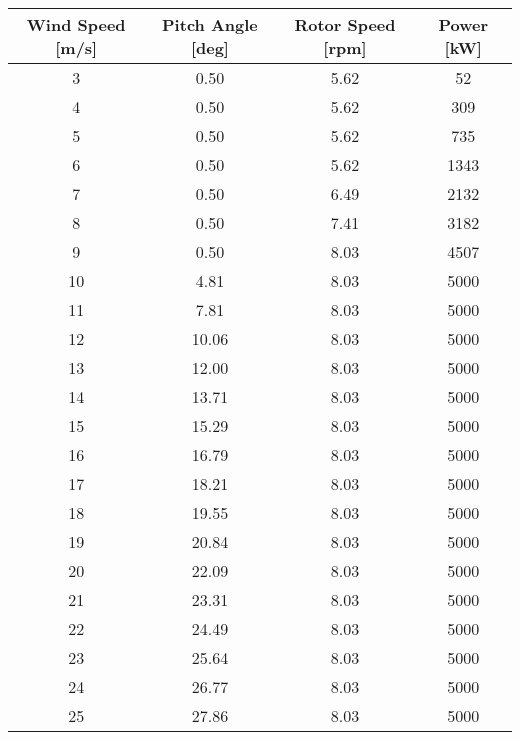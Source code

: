 \begin{table}[!ht]
	\centering
	\begin{tabular}{|c|c|c|c|}
		\hline
		Wind Speed [m/s] & Pitch Angle [deg] & Rotor Speed [rpm] & Power [kW] \\ \hline
		\hline
		3 & 0.50 & 5.62 & 52 \\ \hline
		4 & 0.50 & 5.62 & 309 \\ \hline
		5 & 0.50 & 5.62 & 735 \\ \hline
		6 & 0.50 & 5.62 & 1343 \\ \hline
		7 & 0.50 & 6.49 & 2132 \\ \hline
		8 & 0.50 & 7.41 & 3182 \\ \hline
		9 & 0.50 & 8.03 & 4507 \\ \hline
		10 & 4.81 & 8.03 & 5000 \\ \hline
		11 & 7.81 & 8.03 & 5000 \\ \hline
		12 & 10.06 & 8.03 & 5000 \\ \hline
		13 & 12.00 & 8.03 & 5000 \\ \hline
		14 & 13.71 & 8.03 & 5000 \\ \hline
		15 & 15.29 & 8.03 & 5000 \\ \hline
		16 & 16.79 & 8.03 & 5000 \\ \hline
		17 & 18.21 & 8.03 & 5000 \\ \hline
		18 & 19.55 & 8.03 & 5000 \\ \hline
		19 & 20.84 & 8.03 & 5000 \\ \hline
		20 & 22.09 & 8.03 & 5000 \\ \hline
		21 & 23.31 & 8.03 & 5000 \\ \hline
		22 & 24.49 & 8.03 & 5000 \\ \hline
		23 & 25.64 & 8.03 & 5000 \\ \hline
		24 & 26.77 & 8.03 & 5000 \\ \hline
		25 & 27.86 & 8.03 & 5000 \\ \hline
	\end{tabular}
\end{table}